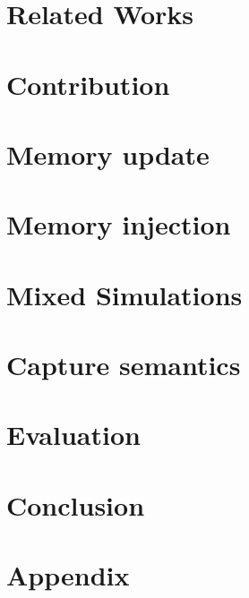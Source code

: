 \documentclass{llncs2e/llncs}
\begin{document}
\section{Related Works}


\section{Contribution}

\section{Memory update}

\section{Memory injection}

\section{Mixed Simulations}

\section{Capture semantics}


\section{Evaluation}


\section{Conclusion}


%
%
\newpage
\nocite{*}



\newpage
\section{Appendix}

\end{document}
